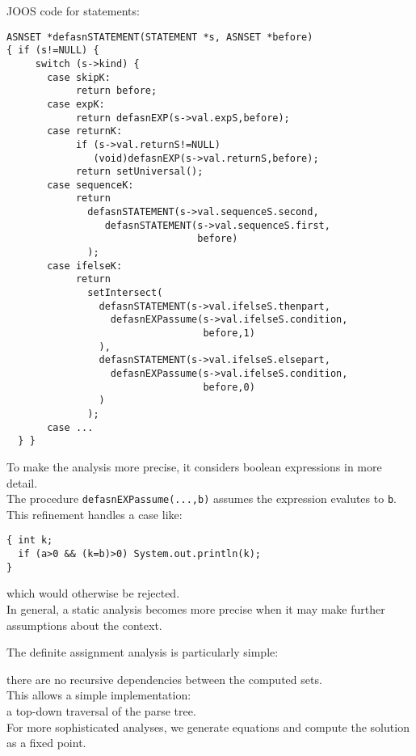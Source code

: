 \begin{slide*}
JOOS code for statements:
\begin{scriptsize}
\begin{verbatim}
ASNSET *defasnSTATEMENT(STATEMENT *s, ASNSET *before)
{ if (s!=NULL) {
     switch (s->kind) {
       case skipK:
            return before;
       case expK:
            return defasnEXP(s->val.expS,before);
       case returnK:
            if (s->val.returnS!=NULL)
               (void)defasnEXP(s->val.returnS,before);
            return setUniversal();
       case sequenceK:
            return 
              defasnSTATEMENT(s->val.sequenceS.second,
                 defasnSTATEMENT(s->val.sequenceS.first,
                                 before)
              );
       case ifelseK:
            return 
              setIntersect(
                defasnSTATEMENT(s->val.ifelseS.thenpart,
                  defasnEXPassume(s->val.ifelseS.condition,
                                  before,1)
                ),
                defasnSTATEMENT(s->val.ifelseS.elsepart,
                  defasnEXPassume(s->val.ifelseS.condition,
                                  before,0)
                )
              );
       case ...
  } }
\end{verbatim}
\end{scriptsize}
\vfil
\end{slide*}

\begin{slide*}
To make the analysis more precise, it considers boolean expressions in more detail.\\

The procedure {\tt defasnEXPassume(...,b)} assumes the expression evalutes to {\tt b}.\\

This refinement handles a case like:
\begin{scriptsize}
\begin{verbatim}
{ int k;
  if (a>0 && (k=b)>0) System.out.println(k);
}
\end{verbatim}
\end{scriptsize}
which would otherwise be rejected.\\

In general, a static analysis becomes more precise when it may
make further assumptions about the context. 
\vfil
\end{slide*}

\begin{slide*}
The definite assignment analysis is particularly simple:

there are no recursive dependencies between the computed sets.\\

This allows a simple implementation:\\ a top-down traversal of the
parse tree.\\

For more sophisticated analyses, we generate equations and compute the solution
as a fixed point.
\vfil
\end{slide*}

